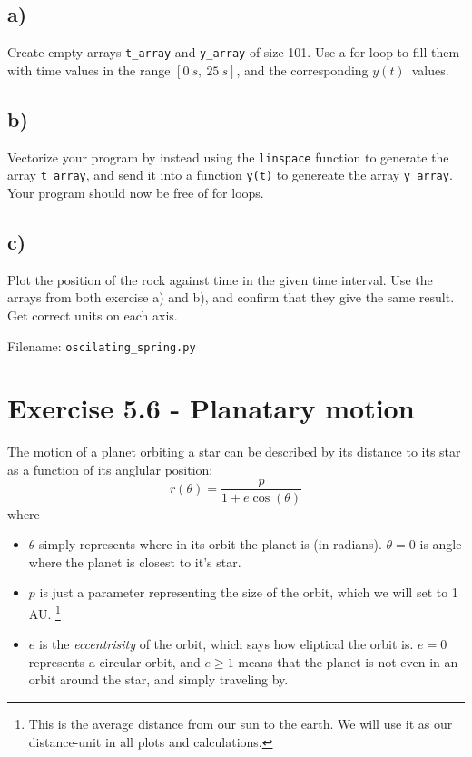 \documentclass[10pt,a4paper]{article}
\begin{document}
\subsection*{a)}
Create empty arrays \texttt{t\_array} and \texttt{y\_array} of size 101. Use a for loop to fill them with time values in the range $[\SI{0}{s},\ \SI{25}{s}]$, and the corresponding $y(t)$ values.

\subsection*{b)}
Vectorize your program by instead using the \texttt{linspace} function to generate the array \texttt{t\_array}, and send it into a function \texttt{y(t)} to genereate the array \texttt{y\_array}. Your program should now be free of for loops.

\subsection*{c)}
Plot the position of the rock against time in the given time interval. Use the arrays from both exercise a) and b), and confirm that they give the same result. Get correct units on each axis.

Filename: \texttt{oscilating\_spring.py}






\section*{Exercise 5.6 - Planatary motion}

The motion of a planet orbiting a star can be described by its distance to its star as a function of its anglular position:
\begin{equation}
r(\theta) = \frac{p}{1+e\cos(\theta)}	\label{eqn:radial_orbit}
\end{equation}
where
\begin{itemize}
\item $\theta$ simply represents where in its orbit the planet is (in radians). $\theta = 0$ is angle where the planet is closest to it's star.

\item $p$ is just a parameter representing the size of the orbit, which we will set to 1 AU. \footnote{This is the average distance from our sun to the earth. We will use it as our distance-unit in all plots and calculations.}

\item $e$ is the \textit{eccentrisity} of the orbit, which says how eliptical the orbit is. $e = 0$ represents a circular orbit, and $e\geq 1$ means that the planet is not even in an orbit around the star, and simply traveling by.
\end{itemize}
\end{document}
